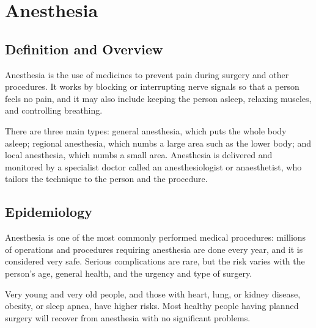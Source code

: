 \chapter{Anesthesia}

\section*{Definition and Overview}
Anesthesia is the use of medicines to prevent pain during surgery and other procedures. It works by blocking or interrupting nerve signals so that a person feels no pain, and it may also include keeping the person asleep, relaxing muscles, and controlling breathing.

There are three main types: general anesthesia, which puts the whole body asleep; regional anesthesia, which numbs a large area such as the lower body; and local anesthesia, which numbs a small area. Anesthesia is delivered and monitored by a specialist doctor called an anesthesiologist or anaesthetist, who tailors the technique to the person and the procedure.

\section*{Epidemiology}
Anesthesia is one of the most commonly performed medical procedures: millions of operations and procedures requiring anesthesia are done every year, and it is considered very safe. Serious complications are rare, but the risk varies with the person's age, general health, and the urgency and type of surgery.

Very young and very old people, and those with heart, lung, or kidney disease, obesity, or sleep apnea, have higher risks. Most healthy people having planned surgery will recover from anesthesia with no significant problems.

